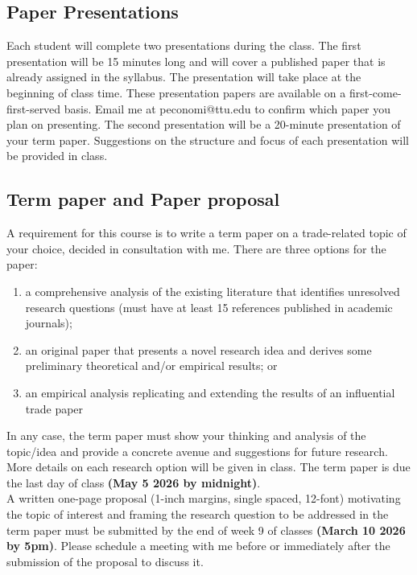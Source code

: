 \documentclass[10pt]{article}
\begin{document}
\subsection*{Paper Presentations}
Each student will complete two presentations during the class. The first presentation will be 15 minutes long and will cover a published paper that is already assigned in the syllabus. 
The presentation will take place at the beginning of class time. 
These presentation papers are available on a first-come-first-served basis. Email me at peconomi@ttu.edu to confirm which paper you plan on presenting. 
The second presentation will be a 20-minute presentation of your term paper. 
Suggestions on the structure and focus of each presentation will be provided in class.

\subsection*{Term paper and Paper proposal}
A requirement for this course is to write a term paper on a trade-related topic of your choice, decided in
consultation with me. There are three options for the paper:
\begin{enumerate}
  \item a comprehensive analysis of the existing literature that identifies unresolved research questions (must have at least 15 references published in academic journals);
  \item an original paper that presents a novel research idea and derives some preliminary theoretical and/or empirical results; or
  \item an empirical analysis replicating and extending the results of an influential trade paper
\end{enumerate}
  
In any case, the term paper must show your thinking and analysis of the topic/idea and provide a concrete avenue and suggestions for future research. 
More details on each research option will be given in class. The term paper is due the last day of class {\bf (May 5 2026 by midnight)}.\\

A written one-page proposal (1-inch margins, single spaced, 12-font) motivating the topic of interest and framing the research question to be addressed in the term paper must be submitted by the end of week 9
of classes {\bf (March 10 2026 by 5pm)}. Please schedule a meeting with me before or immediately after the submission of the proposal to discuss it.
\end{document}
